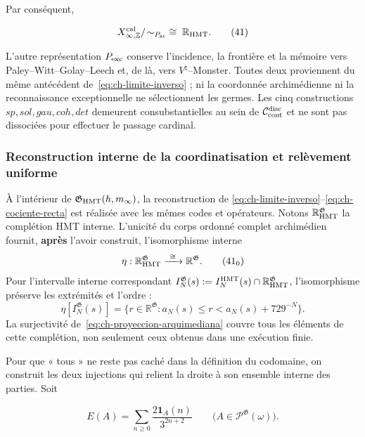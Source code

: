 Par conséquent,

\[
 X_{\infty,\mathbb Z}^{\rm cal}/\!\sim_{P_{\rm ar}}
 \;\cong\;\mathbb R_{\rm HMT}.
\tag{41}\label{eq:ch-cociente-recta}
\]

L'autre représentation \(P_{\rm exc}\) conserve l'incidence, la frontière et la mémoire vers Paley--\allowbreak Witt--\allowbreak Golay--\allowbreak Leech et, de là, vers \(V^\natural\)--Monster. Toutes deux proviennent du même antécédent de~\eqref{eq:ch-limite-inverso} ; ni la coordonnée archimédienne ni la reconnaissance exceptionnelle ne sélectionnent les germes. Les cinq constructions \(sp,sol,gau,coh,det\) demeurent consubstantielles au sein de \(\mathcal C_{\rm cont}^{\rm disc}\) et ne sont pas dissociées pour effectuer le passage cardinal.



\subsubsection{Reconstruction interne de la coordinatisation et relèvement uniforme}

À l'intérieur de \(\mathfrak G_{\rm HMT}(h,m_\infty)\), la reconstruction de \eqref{eq:ch-limite-inverso}--\eqref{eq:ch-cociente-recta} est réalisée avec les mêmes codes et opérateurs. Notons \(\mathbb R_{\rm HMT}^{\mathfrak G}\) la complétion HMT interne. L'unicité du corps ordonné complet archimédien fournit, \textbf{après} l'avoir construit, l'isomorphisme interne
\[
 \eta:\mathbb R_{\rm HMT}^{\mathfrak G}
 \xrightarrow{\ \cong\ }\mathbb R^{\mathfrak G}.
\tag{41$_0$}\label{eq:ch-isomorfismo-interno}
\]
Pour l’intervalle interne correspondant
\(I_N^{\mathfrak G}(s):=
 I_N^{\rm HMT}(s)\cap\mathbb R_{\rm HMT}^{\mathfrak G}\), l’isomorphisme
préserve les extrémités et l’ordre :
\[
 \eta[I_N^{\mathfrak G}(s)]
 =\{r\in\mathbb R^{\mathfrak G}:
      a_N(s)\le r<a_N(s)+729^{-N}\}.
\tag{41$_0$a}\label{eq:ch-intervalos-internos}
\]
La surjectivité de~\eqref{eq:ch-proyeccion-arquimediana} couvre tous les éléments de cette complétion, non
seulement ceux obtenus dans une exécution finie.

Pour que « tous » ne reste pas caché dans la définition du codomaine, on construit
les deux injections qui relient la droite à son ensemble interne des parties. Soit

\[
 E(A)=\sum_{n\ge0}\frac{2\mathbf1_A(n)}{3^{2n+2}}
 \qquad
 \bigl(A\in\mathcal P^{\mathfrak G}(\omega)\bigr).
\tag{41a}\label{eq:ch-incrustacion-cantor}
\]

